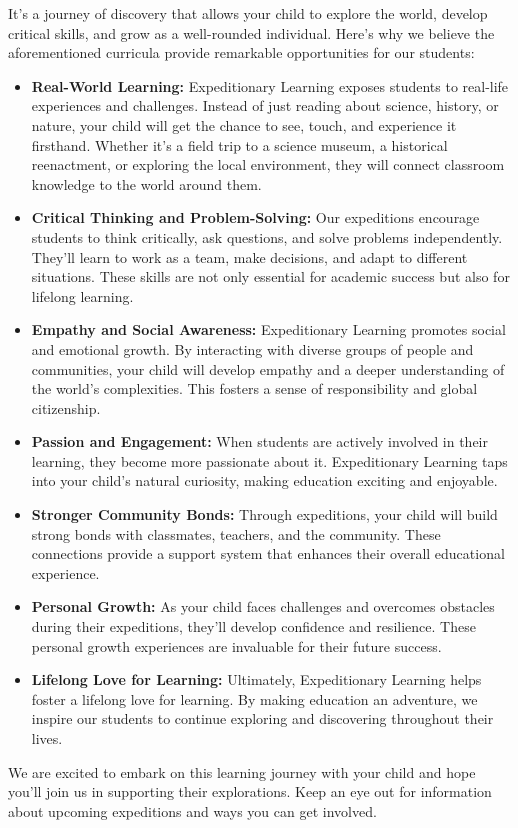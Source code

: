 \documentclass[11pt, letterpaper]{article}
\begin{document}
It's a journey of discovery that allows your child to explore the world, develop critical skills, and grow as a well-rounded individual. Here's why we believe the aforementioned curricula provide remarkable opportunities for our students: 
\begin{itemize}
\item \textbf{Real-World Learning:} Expeditionary Learning exposes students to real-life experiences and challenges. Instead of just reading about science, history, or nature, your child will get the chance to see, touch, and experience it firsthand. Whether it's a field trip to a science museum, a historical reenactment, or exploring the local environment, they will connect classroom knowledge to the world around them.
\item \textbf{Critical Thinking and Problem-Solving:} Our expeditions encourage students to think critically, ask questions, and solve problems independently. They'll learn to work as a team, make decisions, and adapt to different situations. These skills are not only essential for academic success but also for lifelong learning.
\item \textbf{Empathy and Social Awareness:} Expeditionary Learning promotes social and emotional growth. By interacting with diverse groups of people and communities, your child will develop empathy and a deeper understanding of the world's complexities. This fosters a sense of responsibility and global citizenship.
\item \textbf{Passion and Engagement:} When students are actively involved in their learning, they become more passionate about it. Expeditionary Learning taps into your child's natural curiosity, making education exciting and enjoyable.
\item \textbf{Stronger Community Bonds:} Through expeditions, your child will build strong bonds with classmates, teachers, and the community. These connections provide a support system that enhances their overall educational experience.
\item \textbf{Personal Growth:} As your child faces challenges and overcomes obstacles during their expeditions, they'll develop confidence and resilience. These personal growth experiences are invaluable for their future success.
\item \textbf{Lifelong Love for Learning:} Ultimately, Expeditionary Learning helps foster a lifelong love for learning. By making education an adventure, we inspire our students to continue exploring and discovering throughout their lives.
\end{itemize}
We are excited to embark on this learning journey with your child and hope you'll join us in supporting their explorations. Keep an eye out for information about upcoming expeditions and ways you can get involved.
\end{document}
